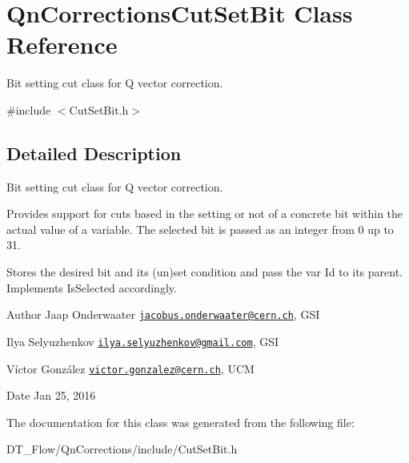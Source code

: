 \hypertarget{classQnCorrectionsCutSetBit}{}\section{Qn\+Corrections\+Cut\+Set\+Bit Class Reference}
\label{classQnCorrectionsCutSetBit}


Bit setting cut class for Q vector correction.  




{\ttfamily \#include $<$Cut\+Set\+Bit.\+h$>$}



\subsection{Detailed Description}
Bit setting cut class for Q vector correction. 

Provides support for cuts based in the setting or not of a concrete bit within the actual value of a variable. The selected bit is passed as an integer from 0 up to 31.

Stores the desired bit and its (un)set condition and pass the var Id to its parent. Implements Is\+Selected accordingly.

\begin{DoxyAuthor}{Author}
Jaap Onderwaater \href{mailto:jacobus.onderwaater@cern.ch}{\tt jacobus.\+onderwaater@cern.\+ch}, G\+SI 

Ilya Selyuzhenkov \href{mailto:ilya.selyuzhenkov@gmail.com}{\tt ilya.\+selyuzhenkov@gmail.\+com}, G\+SI 

Víctor González \href{mailto:victor.gonzalez@cern.ch}{\tt victor.\+gonzalez@cern.\+ch}, U\+CM 
\end{DoxyAuthor}
\begin{DoxyDate}{Date}
Jan 25, 2016 
\end{DoxyDate}


The documentation for this class was generated from the following file\+:\begin{DoxyCompactItemize}
\item 
D\+T\+\_\+\+Flow/\+Qn\+Corrections/include/Cut\+Set\+Bit.\+h\end{DoxyCompactItemize}
